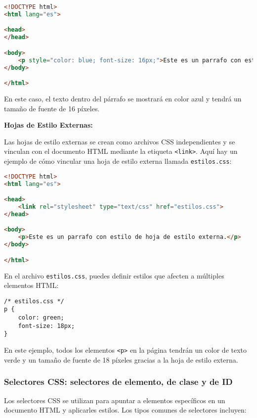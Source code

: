 \documentclass[executivepaper]{article}
\begin{document}
\begin{lstlisting}[language=HTML]
<!DOCTYPE html>
<html lang="es">

<head>
</head>

<body>
    <p style="color: blue; font-size: 16px;">Este es un parrafo con estilo en linea.</p>
</body>

</html>
\end{lstlisting}

En este caso, el texto dentro del párrafo se mostrará en color azul y tendrá un tamaño de fuente de 16 píxeles.

\textbf{Hojas de Estilo Externas:}

Las hojas de estilo externas se crean como archivos CSS independientes y se vinculan con el documento HTML mediante la etiqueta \texttt{<link>}. Aquí hay un ejemplo de cómo vincular una hoja de estilo externa llamada \texttt{estilos.css}:

\begin{lstlisting}[language=HTML]
<!DOCTYPE html>
<html lang="es">

<head>
    <link rel="stylesheet" type="text/css" href="estilos.css">
</head>

<body>
    <p>Este es un parrafo con estilo de hoja de estilo externa.</p>
</body>

</html>
\end{lstlisting}

En el archivo \texttt{estilos.css}, puedes definir estilos que afecten a múltiples elementos HTML:

\begin{lstlisting}
/* estilos.css */
p {
    color: green;
    font-size: 18px;
}
\end{lstlisting}

En este ejemplo, todos los elementos \texttt{<p>} en la página tendrán un color de texto verde y un tamaño de fuente de 18 píxeles gracias a la hoja de estilo externa.


\subsubsection*{Selectores CSS: selectores de elemento, de clase y de ID}

Los selectores CSS se utilizan para apuntar a elementos específicos en un documento HTML y aplicarles estilos. Los tipos comunes de selectores incluyen:
\end{document}
